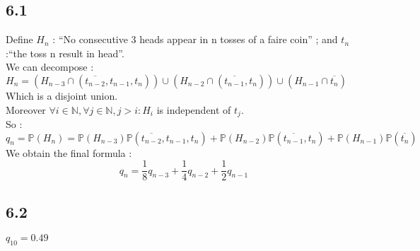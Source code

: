 \documentclass{article}
\begin{document}
\subsection*{6.1}
Define $H_n$ : ``No consecutive 3 heads appear in n tosses of a faire coin'' ; and $t_n$ :``the toss n result in head''.
\\
We can decompose : $H_n = (H_{n-3}\cap(\overline{t_{n-2}},t_{n-1},t_{n}))\cup(H_{n-2}\cap(\overline{t_{n-1}},t_n))\cup(H_{n-1}\cap\overline{t_n})$
Which is a disjoint union.
\\
Moreover $\forall i \in \mathbb{N}, \forall j\in\mathbb{N}, j > i :  H_i$ is independent of $t_j $.
\\
So : $q_n=\mathbb{P}(H_n) = \mathbb{P}(H_{n-3})\mathbb{P}(\overline{t_{n-2}},t_{n-1},t_{n})+\mathbb{P}(H_{n-2})\mathbb{P}(\overline{t_{n-1}},t_n)+\mathbb{P}(H_{n-1})\mathbb{P}(\overline{t_n})$
\\
We obtain the final formula : $$q_n = \frac{1}{8}q_{n-3}+\frac{1}{4}q_{n-2}+\frac{1}{2}q_{n-1}$$
\subsection*{6.2}
$q_{10} = 0.49$
\end{document}
